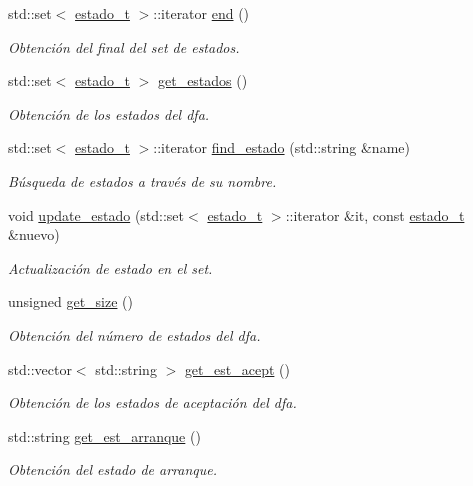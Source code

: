 \begin{DoxyCompactItemize}
std\+::set$<$ \hyperlink{classestado__t}{estado\+\_\+t} $>$\+::iterator \hyperlink{classdfa__t_aa814b8669262e1642a8c301053eee73e}{end} ()
\begin{DoxyCompactList}\small\item\em Obtención del final del set de estados. \end{DoxyCompactList}\item 
std\+::set$<$ \hyperlink{classestado__t}{estado\+\_\+t} $>$ \hyperlink{classdfa__t_aa9042e8cf0e8f63c5ab43e6a507c21fd}{get\+\_\+estados} ()
\begin{DoxyCompactList}\small\item\em Obtención de los estados del dfa. \end{DoxyCompactList}\item 
std\+::set$<$ \hyperlink{classestado__t}{estado\+\_\+t} $>$\+::iterator \hyperlink{classdfa__t_a009ecef89da097d13f573c80062dd082}{find\+\_\+estado} (std\+::string \&name)
\begin{DoxyCompactList}\small\item\em Búsqueda de estados a través de su nombre. \end{DoxyCompactList}\item 
void \hyperlink{classdfa__t_a84affce2b34a8290968eb089a14b773e}{update\+\_\+estado} (std\+::set$<$ \hyperlink{classestado__t}{estado\+\_\+t} $>$\+::iterator \&it, const \hyperlink{classestado__t}{estado\+\_\+t} \&nuevo)
\begin{DoxyCompactList}\small\item\em Actualización de estado en el set. \end{DoxyCompactList}\item 
unsigned \hyperlink{classdfa__t_a188981b0dbc57a59cb2aef6a39f7015b}{get\+\_\+size} ()
\begin{DoxyCompactList}\small\item\em Obtención del número de estados del dfa. \end{DoxyCompactList}\item 
std\+::vector$<$ std\+::string $>$ \hyperlink{classdfa__t_a89e3710476f78b84b785787c59cc9850}{get\+\_\+est\+\_\+acept} ()
\begin{DoxyCompactList}\small\item\em Obtención de los estados de aceptación del dfa. \end{DoxyCompactList}\item 
std\+::string \hyperlink{classdfa__t_a922124c387f1be1c8ce0c5395bfce6c7}{get\+\_\+est\+\_\+arranque} ()
\begin{DoxyCompactList}\small\item\em Obtención del estado de arranque. \end{DoxyCompactList}\item 

\end{DoxyCompactItemize}
